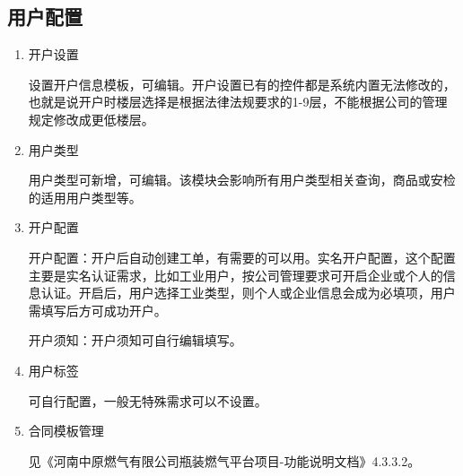 \documentclass[UTF8]{ctexart}
\begin{document}
\subsection{用户配置}
\begin{enumerate}
	\item 开户设置
	
	设置开户信息模板，可编辑。开户设置已有的控件都是系统内置无法修改的，也就是说开户时楼层选择是根据法律法规要求的1-9层，不能根据公司的管理规定修改成更低楼层。
	
	\item 用户类型
	
	用户类型可新增，可编辑。该模块会影响所有用户类型相关查询，商品或安检的适用用户类型等。
	
	\item 开户配置
	
	开户配置：开户后自动创建工单，有需要的可以用。实名开户配置，这个配置主要是实名认证需求，比如工业用户，按公司管理要求可开启企业或个人的信息认证。开启后，用户选择工业类型，则个人或企业信息会成为必填项，用户需填写后方可成功开户。
	
	开户须知：开户须知可自行编辑填写。
	
	\item 用户标签
	
	可自行配置，一般无特殊需求可以不设置。
	
	\item 合同模板管理
	
	见《河南中原燃气有限公司瓶装燃气平台项目-功能说明文档》4.3.3.2。
	
\end{enumerate}
\end{document}
